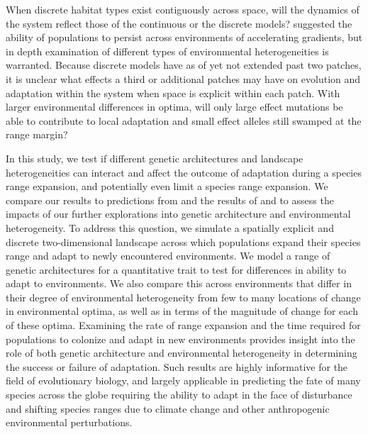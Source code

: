 When discrete habitat types exist contiguously across space, will the dynamics of the system reflect those of the continuous or the discrete models? %
\citet{Barton:2001} suggested the ability of populations to persist across environments of accelerating gradients, but in depth examination of different types of environmental heterogeneities is warranted. Because discrete models have as of yet not extended past two patches, it is unclear what effects a third or additional patches may have on evolution and adaptation within the system when space is explicit within each patch. With larger environmental differences in optima, will only large effect mutations be able to contribute to local adaptation and small effect alleles still swamped at the range margin?

In this study, we test if different genetic architectures and landscape heterogeneities can interact and affect the outcome of adaptation during a species range expansion, and potentially even limit a species range expansion. We compare our results to predictions from \citet{Barton:2001} and the results of \citet{Bridle:2010} and \citet{Schiffers:2014} to assess the impacts of our further explorations into genetic architecture and environmental heterogeneity. 
To address this question, we simulate a spatially explicit and discrete two-dimensional landscape across which populations expand their species range and adapt to newly encountered environments. We model a range of genetic architectures for a quantitative trait to test for differences in ability to adapt to environments. We also compare this across environments that differ in their degree of environmental heterogeneity from few to many locations of change in environmental optima, as well as in terms of the magnitude of change for each of these optima. Examining the rate of range expansion and the time required for populations to colonize and adapt in new environments provides insight into the role of both genetic architecture and environmental heterogeneity in determining the success or failure of adaptation. Such results are highly informative for the field of evolutionary biology, and largely applicable in predicting the fate of many species across the globe requiring the ability to adapt in the face of disturbance and shifting species ranges due to climate change and other anthropogenic environmental perturbations.


